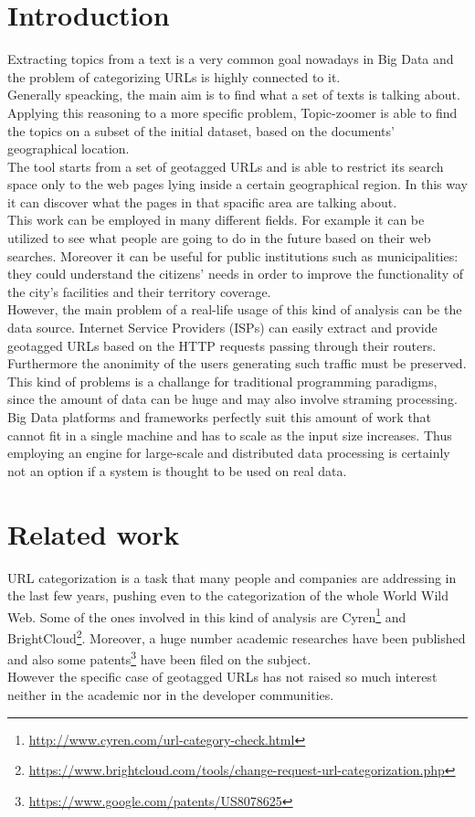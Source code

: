 \documentclass{sig-alternate-05-2015}
\begin{document}
\section{Introduction}
Extracting topics from a text is a very common goal nowadays in Big Data and the problem of categorizing URLs is highly connected to it.\\
Generally speacking, the main aim is to find what a set of texts is talking about. Applying this reasoning to a more specific problem, Topic-zoomer is able to find the topics on a subset of the initial dataset, based on the documents' geographical location.\\
The tool starts from a set of geotagged URLs and is able to restrict its search space only to the web pages lying inside a certain geographical region. In this way it can discover what the pages in that spacific area are talking about.\\
This work can be employed in many different fields. For example it can be utilized to see what people are going to do in the future based on their web searches. Moreover it can be useful for public institutions such as municipalities: they could understand the citizens' needs in order to improve the functionality of the city's facilities and their territory coverage.\\
However, the main problem of a real-life usage of this kind of analysis can be the data source. Internet Service Providers (ISPs) can easily extract and provide geotagged URLs based on the HTTP requests passing through their routers. Furthermore the anonimity of the users generating such traffic must be preserved.\\
This kind of problems is a challange for traditional programming paradigms, since the amount of data can be huge and may also involve straming  processing. Big Data platforms and frameworks perfectly suit this amount of work that cannot fit in a single machine and has to scale as the input size increases. Thus employing an engine for large-scale and distributed data processing is certainly not an option if a system is thought to be used on real data.        


\section{Related work}
URL categorization is a task that many people and companies are addressing in the last few years, pushing even to the categorization of the whole World Wild Web. Some of the ones involved in this kind of analysis are Cyren\footnote{\url{http://www.cyren.com/url-category-check.html}} and BrightCloud\footnote{\url{https://www.brightcloud.com/tools/change-request-url-categorization.php}}. Moreover, a huge number academic researches have been published and also some patents\footnote{\url{https://www.google.com/patents/US8078625}} have been filed on the subject.\\
However the specific case of geotagged URLs has not raised so much interest neither in the academic nor in the developer communities.
\end{document}
